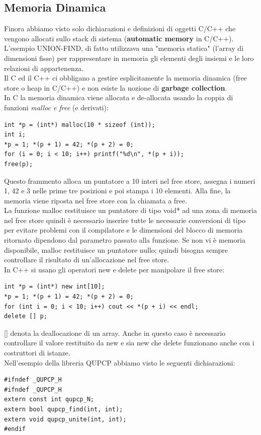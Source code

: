 \documentclass[a4paper,12pt, oneside]{book}
\begin{document}
	\subsection{Memoria Dinamica}
	Finora abbiamo visto solo dichiarazioni e definizioni di oggetti C/C++ che vengono allocati sullo stack di sistema (\textbf{automatic memory} in C/C++). L'esempio UNION-FIND, di fatto utilizzava una "memoria statica"
	(l'array di dimensioni fisse) per rappresentare in memoria gli elementi
	degli insiemi e le loro relazioni di appartenenza.\\
	Il C ed il C++ ci obbligano a gestire esplicitamente la memoria dinamica
	(free store o heap in C/C++) e non esiste la nozione di \textbf{garbage collection}.\\
	In C la memoria dinamica viene allocata e de-allocata usando la coppia
	di funzioni \textit{malloc e free }(e derivati):
	\begin{verbatim}
int *p = (int*) malloc(10 * sizeof (int));
int i;
*p = 1; *(p + 1) = 42; *(p + 2) = 0;
for (i = 0; i < 10; i++) printf("%d\n", *(p + i));
free(p);
\end{verbatim}
	Questo frammento alloca un puntatore a 10 interi nel free store, assegna i numeri 1, 42 e 3 nelle prime tre posizioni e poi stampa i 10 elementi. Alla fine, la memoria viene riposta nel free store con la chiamata a free.\\
	La funzione malloc restituisce un puntatore di tipo void* ad
	una zona di memoria nel free store quindi è necessario inserire tutte le necessarie conversioni di tipo
	per evitare problemi con il compilatore e le dimensioni del blocco di memoria ritornato dipendono dal
	parametro passato alla funzione. Se non vi è memoria disponibile, malloc restituisce un puntatore
	nullo; quindi bisogna sempre controllare il risultato di un'allocazione nel free store.\\
	In C++ si usano gli operatori new e delete per manipolare il
	free store:
	\begin{verbatim}
int *p = (int*) new int[10];
*p = 1; *(p + 1) = 42; *(p + 2) = 0;
for (int i = 0; i < 10; i++) cout << *(p + i) << endl;
delete [] p;
\end{verbatim}
	[] denota la deallocazione di un array. Anche in questo caso è necessario controllare il valore restituito
	da new e sia new che delete funzionano anche con i costruttori di istanze.\\
	Nell'esempio della libreria QUPCP abbiamo visto le seguenti
	dichiarazioni:
	\begin{verbatim}
#ifndef _QUPCP_H
#ifndef _QUPCP_H
extern const int qupcp_N;
extern bool qupcp_find(int, int);
extern void qupcp_unite(int, int);
#endif
\end{verbatim}
\end{document}
